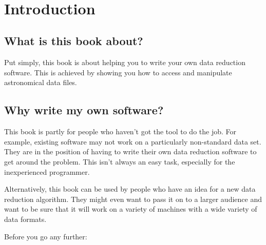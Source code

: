 \stardocabstract
\newpage
\begin{latexonly}
   \setlength{\parskip}{0mm}
   \tableofcontents
   \setlength{\parskip}{\medskipamount}
   \markright{\stardocname}
\end{latexonly}
\newpage
~
\newpage
\renewcommand{\thepage}{\arabic{page}}
\setcounter{page}{1}

\section{Introduction}

\subsection{What is this book about?}

Put simply, this book is about helping you to write
your own data reduction software. This is achieved
by showing you how to access and manipulate astronomical
data files.

\subsection{Why write my own software?}

This book is partly for people who haven't got the tool to do the job. For
example, existing software may not work on a particularly non-standard
data set.  They are in the position of having to write their own data
reduction software to get around the problem. This isn't always an easy
task, especially for the inexperienced programmer.

Alternatively, this book can be used by people who have an idea for a new
data reduction algorithm.  They might even want to pass it on to a larger
audience and want to be sure that it will work on a variety of machines
with a wide variety of data formats.

Before you go any further:

\begin{quote}
{}
\end{quote}

